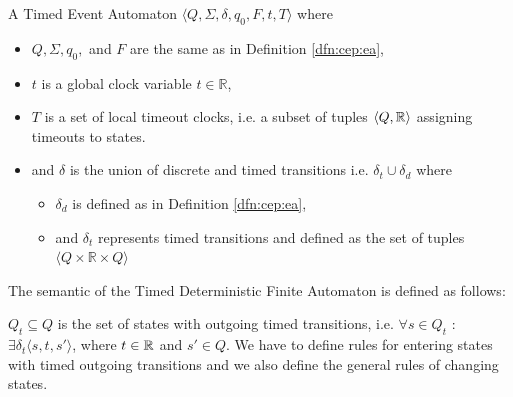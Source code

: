				\begin{dfn}
					\label{dfn:cep:tea}
					A Timed Event Automaton $\langle Q,\Sigma,\delta,q_0, F, t, T \rangle$ where
					\begin{itemize}
						\item $Q, \Sigma, q_0,$ and $F$ are the same as in Definition \ref{dfn:cep:ea},
						\item $t$ is a global clock variable $t \in \mathbb{R}$,
						\item $T$ is a set of local timeout clocks, i.e. a subset of tuples $\langle Q, \mathbb{R} \rangle$ assigning timeouts to states.
						\item and $\delta$ is the union of discrete and timed transitions i.e. $\delta_t \cup \delta_d$ where
						\begin{itemize}
							\item $\delta_d$ is defined as in Definition \ref{dfn:cep:ea},
							\item and $\delta_t$ represents timed transitions and defined as the set of tuples $\langle Q \times \mathbb{R} \times Q \rangle$ 
						\end{itemize}
					\end{itemize}
				\end{dfn}
				
				The semantic of the Timed Deterministic Finite Automaton is defined as follows:
				
				$Q_t \subseteq Q$ is the set of states with outgoing timed transitions, 
				i.e. $\forall s \in Q_t$ : $ \exists \delta_t\langle s, t, s' \rangle$, where $t \in \mathbb{R}$ and $s' \in Q$.
				We have to define rules for entering states with timed outgoing transitions and we also define the general rules of changing states. 
				
